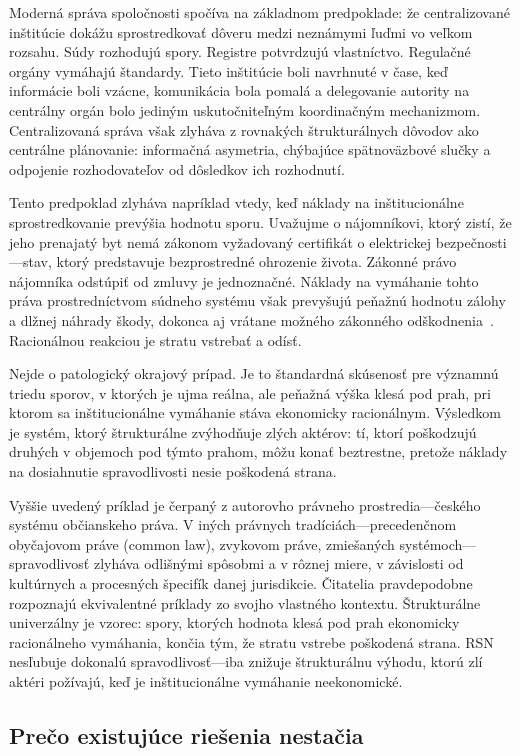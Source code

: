 \documentclass[11pt,a4paper,twocolumn]{article}
\begin{document}
Moderná správa spoločnosti spočíva na základnom predpoklade: že centralizované inštitúcie dokážu sprostredkovať dôveru medzi neznámymi ľuďmi vo veľkom rozsahu. Súdy rozhodujú spory. Registre potvrdzujú vlastníctvo. Regulačné orgány vymáhajú štandardy. Tieto inštitúcie boli navrhnuté v čase, keď informácie boli vzácne, komunikácia bola pomalá a delegovanie autority na centrálny orgán bolo jediným uskutočniteľným koordinačným mechanizmom. Centralizovaná správa však zlyháva z rovnakých štrukturálnych dôvodov ako centrálne plánovanie: informačná asymetria, chýbajúce spätnoväzbové slučky a odpojenie rozhodovateľov od dôsledkov ich rozhodnutí.

Tento predpoklad zlyháva napríklad vtedy, keď náklady na inštitucionálne sprostredkovanie prevýšia hodnotu sporu. Uvažujme o nájomníkovi, ktorý zistí, že jeho prenajatý byt nemá zákonom vyžadovaný certifikát o elektrickej bezpečnosti---stav, ktorý predstavuje bezprostredné ohrozenie života. Zákonné právo nájomníka odstúpiť od zmluvy je jednoznačné. Náklady na vymáhanie tohto práva prostredníctvom súdneho systému však prevyšujú peňažnú hodnotu zálohy a dlžnej náhrady škody, dokonca aj vrátane možného zákonného odškodnenia~\cite{czcourtfees}. Racionálnou reakciou je stratu vstrebať a odísť.

Nejde o patologický okrajový prípad. Je to štandardná skúsenosť pre významnú triedu sporov, v ktorých je ujma reálna, ale peňažná výška klesá pod prah, pri ktorom sa inštitucionálne vymáhanie stáva ekonomicky racionálnym. Výsledkom je systém, ktorý štrukturálne zvýhodňuje zlých aktérov: tí, ktorí poškodzujú druhých v objemoch pod týmto prahom, môžu konať beztrestne, pretože náklady na dosiahnutie spravodlivosti nesie poškodená strana.

Vyššie uvedený príklad je čerpaný z autorovho právneho prostredia---českého systému občianskeho práva. V iných právnych tradíciách---precedenčnom obyčajovom práve (common law), zvykovom práve, zmiešaných systémoch---spravodlivosť zlyháva odlišnými spôsobmi a v rôznej miere, v závislosti od kultúrnych a procesných špecifík danej jurisdikcie. Čitatelia pravdepodobne rozpoznajú ekvivalentné príklady zo svojho vlastného kontextu. Štrukturálne univerzálny je vzorec: spory, ktorých hodnota klesá pod prah ekonomicky racionálneho vymáhania, končia tým, že stratu vstrebe poškodená strana. RSN nesľubuje dokonalú spravodlivosť---iba znižuje štrukturálnu výhodu, ktorú zlí aktéri požívajú, keď je inštitucionálne vymáhanie neekonomické.

\subsection{Prečo existujúce riešenia nestačia}
\end{document}
